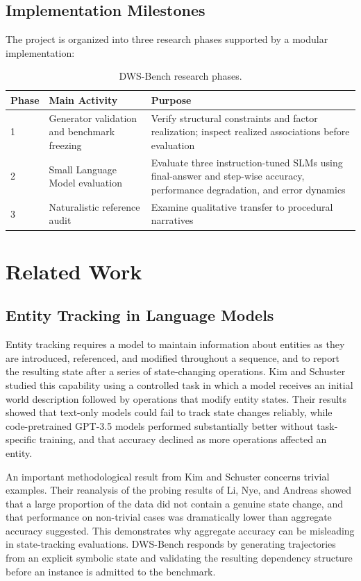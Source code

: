 \documentclass{iutbscthesis}
\begin{document}
\section{Implementation Milestones}
The project is organized into three research phases supported by a modular implementation:
\begin{table}[H]
\centering
\begin{tabular}{p{}p{}p{}}
\toprule
\textbf{Phase} & \textbf{Main Activity} & \textbf{Purpose} \\
\midrule
1 & Generator validation and benchmark freezing & Verify structural constraints and factor realization;
inspect realized associations before evaluation \\
2 & Small Language Model evaluation & Evaluate three instruction-tuned SLMs using final-answer and
step-wise accuracy, performance degradation, and error dynamics \\
3 & Naturalistic reference audit & Examine qualitative transfer to procedural narratives \\
\bottomrule
\end{tabular}
\caption{DWS-Bench research phases.}
\label{tab:milestones}
\end{table}

\chapter{Related Work}
\section{Entity Tracking in Language Models}
Entity tracking requires a model to maintain information about entities as they are introduced,
referenced, and modified throughout a sequence, and to report the resulting state after a series of
state-changing operations. Kim and Schuster \cite{kim2023entity} studied this capability using a
controlled task in which a model receives an initial world description followed by operations that
modify entity states. Their results showed that text-only models could fail to track state changes
reliably, while code-pretrained GPT-3.5 models performed substantially better without task-specific
training, and that accuracy declined as more operations affected an entity.

An important methodological result from Kim and Schuster \cite{kim2023entity} concerns trivial
examples. Their reanalysis of the probing results of Li, Nye, and Andreas \cite{li2021implicit}
showed that a large proportion of the data did not contain a genuine state change, and that
performance on non-trivial cases was dramatically lower than aggregate accuracy suggested. This
demonstrates why aggregate accuracy can be misleading in state-tracking evaluations. DWS-Bench
responds by generating trajectories from an explicit symbolic state and validating the resulting
dependency structure before an instance is admitted to the benchmark.
\end{document}
